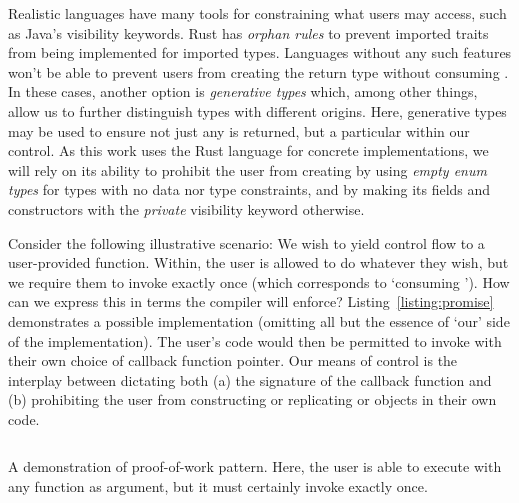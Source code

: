 Realistic languages have many tools for constraining what users may access, such as Java's visibility keywords. Rust has \textit{orphan rules} to prevent imported traits from being implemented for imported types. Languages without any such features won't be able to prevent users from creating the return type  without consuming . In these cases, another option is \textit{generative types} which, among other things, allow us to further distinguish types with different origins. Here, generative types may be used to ensure not just any  is returned, but a particular  within our control. As this work uses the Rust language for concrete implementations, we will rely on its ability to prohibit the user from creating  by using \textit{empty enum types} for types with no data nor type constraints, and by making its fields and constructors with the \textit{private} visibility keyword otherwise\cite{exotic_sizes}.

Consider the following illustrative scenario: We wish to yield control flow to a user-provided function. Within, the user is allowed to do whatever they wish, but we require them to invoke   exactly once (which corresponds to `consuming '). How can we express this in terms the compiler will enforce? Listing~\ref{listing:promise} demonstrates a possible implementation (omitting all but the essence of `our' side of the implementation). The user's code would then be permitted to invoke  with their own choice of callback function pointer. Our means of control is the interplay between dictating both (a)
the signature of the callback function and (b) prohibiting the user from constructing or replicating  or  objects in their own code.

\begin{listing}[ht]
	\inputminted[]{rust}{promise.rs}
	\caption[Proof of work pattern example of `promises'.]{A demonstration of proof-of-work pattern. Here, the user is able to execute  with any function as argument, but it must certainly invoke  exactly once.}
	\label{listing:promise}
\end{listing}
